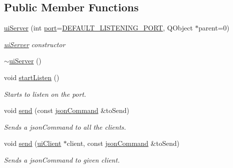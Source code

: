 \subsection*{Public Member Functions}
\begin{DoxyCompactItemize}
\item 
\hyperlink{classserver_1_1ui_server_a55e34b95359692ea9002408075e18b1a}{ui\-Server} (int \hyperlink{classserver_1_1ui_server_a960211cb9716f5d3b403d10ccface8b8}{port}=\hyperlink{uiserver_8h_abfcdb1becb6170a9ddc3b4e7090169e1}{D\-E\-F\-A\-U\-L\-T\-\_\-\-L\-I\-S\-T\-E\-N\-I\-N\-G\-\_\-\-P\-O\-R\-T}, Q\-Object $\ast$parent=0)
\begin{DoxyCompactList}\small\item\em \hyperlink{classserver_1_1ui_server}{ui\-Server} constructor \end{DoxyCompactList}\item 
\hyperlink{classserver_1_1ui_server_ac56c764040625f23de20dbc0ffcd5298}{$\sim$ui\-Server} ()
\item 
void \hyperlink{classserver_1_1ui_server_a7df8c4bff6f0dea8259f91aec65715c9}{start\-Listen} ()
\begin{DoxyCompactList}\small\item\em Starts to listen on the port. \end{DoxyCompactList}\item 
void \hyperlink{classserver_1_1ui_server_ab9e9ed944311c42f019c645c3e0539cf}{send} (const \hyperlink{class_k4_u_1_1json_command}{json\-Command} \&to\-Send)
\begin{DoxyCompactList}\small\item\em Sends a json\-Command to all the clients. \end{DoxyCompactList}\item 
void \hyperlink{classserver_1_1ui_server_a643cfadd56a92b52edbcee2201fd8924}{send} (\hyperlink{classserver_1_1ui_client}{ui\-Client} $\ast$client, const \hyperlink{class_k4_u_1_1json_command}{json\-Command} \&to\-Send)
\begin{DoxyCompactList}\small\item\em Sends a json\-Command to given client. \end{DoxyCompactList}\end{DoxyCompactItemize}
